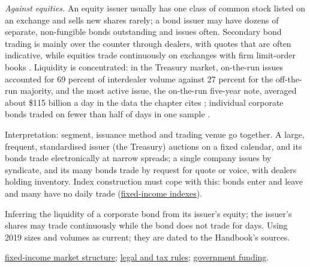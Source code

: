 \begin{qfdefinition}
 \emph{Against equities.} An equity issuer usually has one class of common stock listed on an exchange and sells new shares rarely; a bond issuer may have dozens of separate, non-fungible bonds outstanding and issues often. Secondary bond trading is mainly over the counter through dealers, with quotes that are often indicative, while equities trade continuously on exchanges with firm limit-order books \citep[sec.~I, pp.~1--5]{wide-bsv-fi-survey}. Liquidity is concentrated: in the Treasury market, on-the-run issues accounted for 69 percent of interdealer volume against 27 percent for the off-the-run majority, and the most active issue, the on-the-run five-year note, averaged about \$115 billion a day in the data the chapter cites \citep[chap.~7, p.~180]{s7-fabozzifixed}; individual corporate bonds traded on fewer than half of days in one sample \citep[p.~5]{wide-bsv-fi-survey}.

 Interpretation: segment, issuance method and trading venue go together. A large, frequent, standardised issuer (the Treasury) auctions on a fixed calendar, and its bonds trade electronically at narrow spreads; a single company issues by syndicate, and its many bonds trade by request for quote or voice, with dealers holding inventory. Index construction must cope with this: bonds enter and leave and many have no daily trade (\hyperref[def:equity-fixed-income-index-types]{fixed-income indexes}).

 Inferring the liquidity of a corporate bond from its issuer's equity; the issuer's shares may trade continuously while the bond does not trade for days. Using 2019 sizes and volumes as current; they are dated to the Handbook's sources.

 \hyperref[def:fixed-income-market-structure]{fixed-income market structure}; \hyperref[rule:bond-issuance-legal-tax]{legal and tax rules}; \hyperref[def:government-agency-supranational-funding]{government funding}.

\end{qfdefinition}

